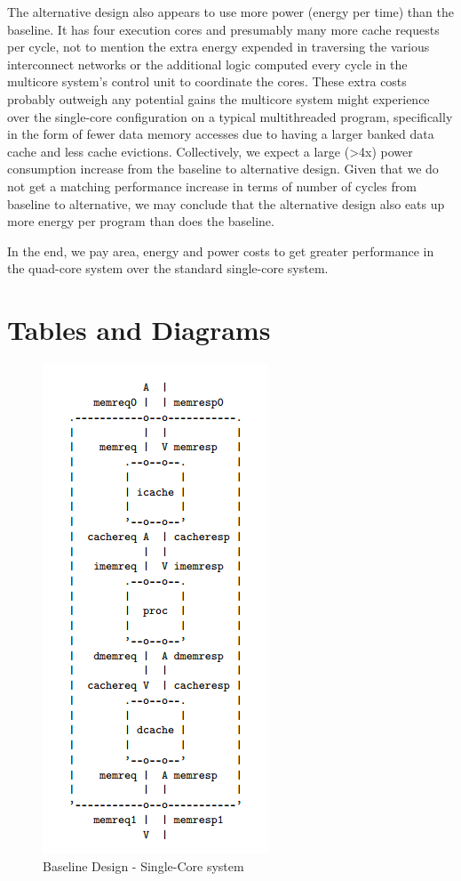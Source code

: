 \documentclass[10pt]{article}
\begin{document}
The alternative design also appears to use more power (energy per time) than the baseline. It has four execution cores and presumably many more cache requests per cycle, not to mention the extra energy expended in traversing the various interconnect networks or the additional logic computed every cycle in the multicore system's control unit to coordinate the cores. These extra costs probably outweigh any potential gains the multicore system might experience over the single-core configuration on a typical multithreaded program, specifically in the form of fewer data memory accesses due to having a larger banked data cache and less cache evictions. Collectively, we expect a large (>4x) power consumption increase from the baseline to alternative design. Given that we do not get a matching performance increase in terms of number of cycles from baseline to alternative, we may conclude that the alternative design also eats up more energy per program than does the baseline.

In the end, we pay area, energy and power costs to get greater performance in the quad-core system over the standard single-core system.


\newpage
\section {Tables and Diagrams}


\begin{figure}[H]
	\centering
	\includegraphics{bline_diag}
	\caption{Baseline Design - Single-Core system}
	\label{fig:bline}
\end{figure}
\end{document}
